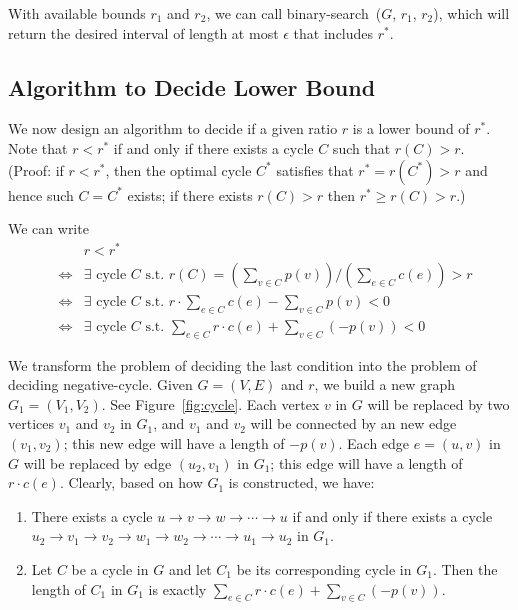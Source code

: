 \begin{minipage}{0.8\textwidth}
	\xxx
	\aab {if $b - a \le \epsilon$: report interval $(a,b]$ and exit;}\xxx
	\xxx
	\xxx
	\xxx
	\xxx
	\xxx
\end{minipage}

With available bounds $r_1$ and $r_2$, we can call binary-search~($G$, $r_1$, $r_2$), which will return
the desired interval of length at most $\epsilon$ that includes $r^*$.


\subsection*{Algorithm to Decide Lower Bound}

We now design an algorithm to decide if a given ratio $r$ is a lower bound of $r^*$.
Note that $r < r^*$ if and only if there exists a cycle $C$ such that $r(C) > r$.
(Proof: if $r < r^*$, then the optimal cycle $C^*$ satisfies that $r^* = r(C^*) > r$ and hence such $C = C^*$ exists;
if there exists $r(C) > r$ then $r^* \ge r(C) > r$.)

We can write
\begin{eqnarray*}
& & r < r^* \\
& \Longleftrightarrow & \exists \textrm{ cycle } C \textrm{ s.t.\ } \textstyle r(C) = (\sum_{v\in C} p(v)) / (\sum_{e\in C} c(e)) > r \\
& \Longleftrightarrow & \exists \textrm{ cycle } C \textrm{ s.t.\ } \textstyle r\cdot \sum_{e\in C} c(e) - \sum_{v\in C} p(v) < 0\\
& \Longleftrightarrow & \exists \textrm{ cycle } C \textrm{ s.t.\ } \textstyle \sum_{e\in C} r\cdot c(e) + \sum_{v\in C} (-p(v)) < 0
\end{eqnarray*}

We transform the problem of deciding the last condition into the problem of deciding negative-cycle.
Given $G = (V, E)$ and $r$, we build a new graph $G_1 = (V_1, V_2)$. See Figure~\ref{fig:cycle}.
Each vertex $v$ in $G$ will be replaced by two vertices $v_1$ and $v_2$ in $G_1$, and $v_1$ and $v_2$ will be connected by an new
edge $(v_1, v_2)$; this new edge will have a length of $-p(v)$. 
Each edge $e = (u,v)$ in $G$ will be replaced by edge $(u_2, v_1)$ in $G_1$; this edge will have a length of $r\cdot c(e)$.
Clearly, based on how $G_1$ is constructed, we have:
\vspace*{-\topsep}
\begin{enumerate}
\item There exists a cycle $u \to v \to w \to \cdots \to u$ if and only if there exists a cycle $u_2 \to v_1 \to v_2 \to w_1 \to w_2 \to \cdots \to u_1 \to u_2$ in $G_1$.
\item Let $C$ be a cycle in $G$ and let $C_1$ be its corresponding cycle in $G_1$. Then the length of $C_1$ in $G_1$ is 
exactly $\sum_{e\in C} r\cdot c(e) + \sum_{v\in C} (-p(v))$.
\end{enumerate}

